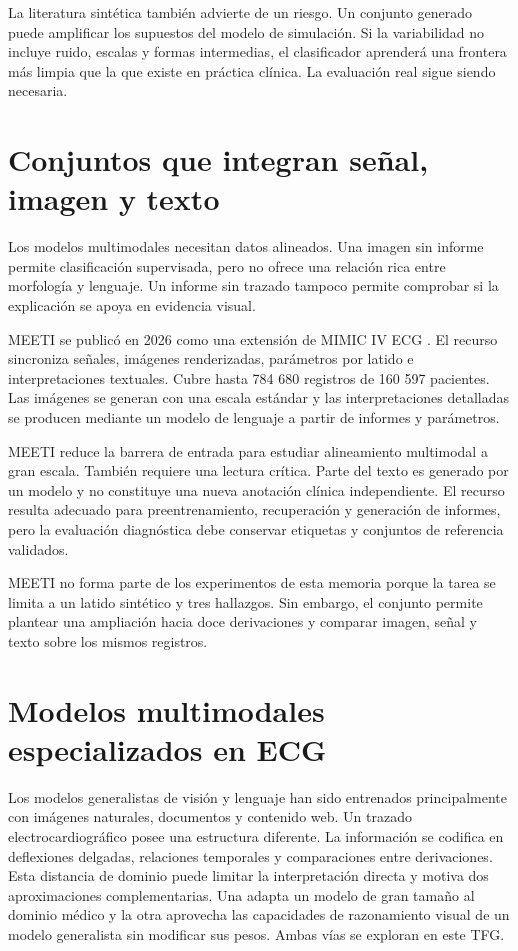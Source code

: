 La literatura sintética también advierte de un riesgo. Un conjunto generado puede amplificar los supuestos del modelo de simulación. Si la variabilidad no incluye ruido, escalas y formas intermedias, el clasificador aprenderá una frontera más limpia que la que existe en práctica clínica. La evaluación real sigue siendo necesaria.

\section{Conjuntos que integran señal, imagen y texto}

Los modelos multimodales necesitan datos alineados. Una imagen sin informe permite clasificación supervisada, pero no ofrece una relación rica entre morfología y lenguaje. Un informe sin trazado tampoco permite comprobar si la explicación se apoya en evidencia visual.

MEETI se publicó en 2026 como una extensión de MIMIC IV ECG \cite{zhang2026meeti}. El recurso sincroniza señales, imágenes renderizadas, parámetros por latido e interpretaciones textuales. Cubre hasta 784 680 registros de 160 597 pacientes. Las imágenes se generan con una escala estándar y las interpretaciones detalladas se producen mediante un modelo de lenguaje a partir de informes y parámetros.

MEETI reduce la barrera de entrada para estudiar alineamiento multimodal a gran escala. También requiere una lectura crítica. Parte del texto es generado por un modelo y no constituye una nueva anotación clínica independiente. El recurso resulta adecuado para preentrenamiento, recuperación y generación de informes, pero la evaluación diagnóstica debe conservar etiquetas y conjuntos de referencia validados.

MEETI no forma parte de los experimentos de esta memoria porque la tarea se limita a un latido sintético y tres hallazgos. Sin embargo, el conjunto permite plantear una ampliación hacia doce derivaciones y comparar imagen, señal y texto sobre los mismos registros.

\section{Modelos multimodales especializados en ECG}

Los modelos generalistas de visión y lenguaje han sido entrenados principalmente con imágenes naturales, documentos y contenido web. Un trazado electrocardiográfico posee una estructura diferente. La información se codifica en deflexiones delgadas, relaciones temporales y comparaciones entre derivaciones. Esta distancia de dominio puede limitar la interpretación directa y motiva dos aproximaciones complementarias. Una adapta un modelo de gran tamaño al dominio médico y la otra aprovecha las capacidades de razonamiento visual de un modelo generalista sin modificar sus pesos. Ambas vías se exploran en este TFG.

